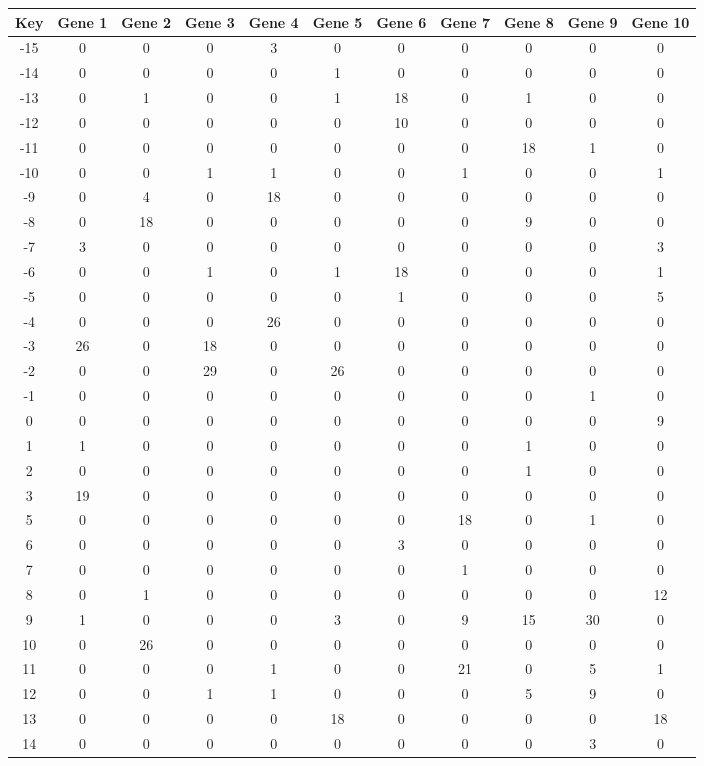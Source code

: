 \begin{tabular}{|c|c|c|c|c|c|c|c|c|c|c|}
\hline
Key & Gene 1 & Gene 2 & Gene 3 & Gene 4 & Gene 5 & Gene 6 & Gene 7 & Gene 8 & Gene 9 & Gene 10 \\
\hline
-15 & 0 & 0 & 0 & 3 & 0 & 0 & 0 & 0 & 0 & 0 \\
-14 & 0 & 0 & 0 & 0 & 1 & 0 & 0 & 0 & 0 & 0 \\
-13 & 0 & 1 & 0 & 0 & 1 & 18 & 0 & 1 & 0 & 0 \\
-12 & 0 & 0 & 0 & 0 & 0 & 10 & 0 & 0 & 0 & 0 \\
-11 & 0 & 0 & 0 & 0 & 0 & 0 & 0 & 18 & 1 & 0 \\
-10 & 0 & 0 & 1 & 1 & 0 & 0 & 1 & 0 & 0 & 1 \\
-9 & 0 & 4 & 0 & 18 & 0 & 0 & 0 & 0 & 0 & 0 \\
-8 & 0 & 18 & 0 & 0 & 0 & 0 & 0 & 9 & 0 & 0 \\
-7 & 3 & 0 & 0 & 0 & 0 & 0 & 0 & 0 & 0 & 3 \\
-6 & 0 & 0 & 1 & 0 & 1 & 18 & 0 & 0 & 0 & 1 \\
-5 & 0 & 0 & 0 & 0 & 0 & 1 & 0 & 0 & 0 & 5 \\
-4 & 0 & 0 & 0 & 26 & 0 & 0 & 0 & 0 & 0 & 0 \\
-3 & 26 & 0 & 18 & 0 & 0 & 0 & 0 & 0 & 0 & 0 \\
-2 & 0 & 0 & 29 & 0 & 26 & 0 & 0 & 0 & 0 & 0 \\
-1 & 0 & 0 & 0 & 0 & 0 & 0 & 0 & 0 & 1 & 0 \\
0 & 0 & 0 & 0 & 0 & 0 & 0 & 0 & 0 & 0 & 9 \\
1 & 1 & 0 & 0 & 0 & 0 & 0 & 0 & 1 & 0 & 0 \\
2 & 0 & 0 & 0 & 0 & 0 & 0 & 0 & 1 & 0 & 0 \\
3 & 19 & 0 & 0 & 0 & 0 & 0 & 0 & 0 & 0 & 0 \\
5 & 0 & 0 & 0 & 0 & 0 & 0 & 18 & 0 & 1 & 0 \\
6 & 0 & 0 & 0 & 0 & 0 & 3 & 0 & 0 & 0 & 0 \\
7 & 0 & 0 & 0 & 0 & 0 & 0 & 1 & 0 & 0 & 0 \\
8 & 0 & 1 & 0 & 0 & 0 & 0 & 0 & 0 & 0 & 12 \\
9 & 1 & 0 & 0 & 0 & 3 & 0 & 9 & 15 & 30 & 0 \\
10 & 0 & 26 & 0 & 0 & 0 & 0 & 0 & 0 & 0 & 0 \\
11 & 0 & 0 & 0 & 1 & 0 & 0 & 21 & 0 & 5 & 1 \\
12 & 0 & 0 & 1 & 1 & 0 & 0 & 0 & 5 & 9 & 0 \\
13 & 0 & 0 & 0 & 0 & 18 & 0 & 0 & 0 & 0 & 18 \\
14 & 0 & 0 & 0 & 0 & 0 & 0 & 0 & 0 & 3 & 0 \\
\hline
\end{tabular}